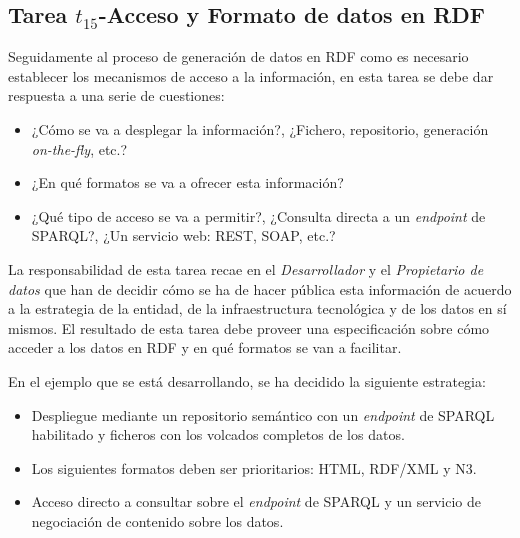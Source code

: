 \subsection{Tarea $t_{15}$-Acceso y Formato de datos en RDF}
Seguidamente al proceso de generación de datos en RDF como \linkeddata es necesario establecer
los mecanismos de acceso a la información, en esta tarea se debe dar respuesta a una
serie de cuestiones:
\begin{itemize}
 \item ¿Cómo se va a desplegar la información?, ¿Fichero, repositorio, generación \textit{on-the-fly}, etc.?
 \item ¿En qué formatos se va a ofrecer esta información?
 \item ¿Qué tipo de acceso se va a permitir?, ¿Consulta directa a un \textit{endpoint} de \gls{SPARQL}?, ¿Un servicio web: \gls{REST}, \gls{SOAP}, etc.?
\end{itemize}

La responsabilidad de esta tarea recae en el \textit{Desarrollador} y el \textit{Propietario de datos} que han de decidir 
cómo se ha de hacer pública esta información de acuerdo a la estrategia de la entidad, de la infraestructura tecnológica y de los datos en sí mismos. 
El resultado de esta tarea debe proveer una especificación sobre cómo acceder a los datos en RDF y en qué formatos se van a facilitar.

En el ejemplo que se está desarrollando, se ha decidido la siguiente estrategia:

\begin{itemize}
 \item Despliegue mediante un repositorio semántico con un \textit{endpoint} de \gls{SPARQL} habilitado y ficheros con los volcados completos de los datos.
 \item Los siguientes formatos deben ser prioritarios: \gls{HTML}, \gls{RDF/XML} y \gls{N3}.
 \item Acceso directo a consultar sobre el \textit{endpoint} de \gls{SPARQL} y un servicio de negociación de contenido sobre los datos.
\end{itemize}

